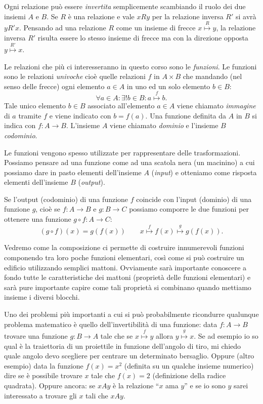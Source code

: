 \documentclass[italian,a4paper,hidelinks,headinclude]{scrartcl}
\newcommand{\myemph}[1]{\emph{#1}\marginpar{#1}}
\begin{document}
Ogni relazione può essere \emph{invertita}
semplicemente scambiando il ruolo
dei due insiemi $A$ e $B$. Se $R$ è una relazione e vale $x R y$
per la relazione inversa $R'$ si avrà
$y R' x$.
Pensando ad una relazione $R$ come un insieme di frecce
$x\stackrel R \mapsto y$,
la relazione inversa $R'$ risulta essere lo stesso insieme di frecce ma
con la direzione opposta $y\stackrel{R'} \mapsto x$.

Le relazioni che più ci interesseranno in questo corso sono le \myemph{funzioni}.
Le funzioni sono le relazioni \emph{univoche} cioè quelle relazioni $f$ in
$A\times B$ che
mandando (nel senso delle frecce) ogni elemento $a\in A$ in uno
ed un solo elemento
$b\in B$:
\[
\forall a\in A\colon \exists ! b\in B\colon a\stackrel{f}\mapsto b.
\]
Tale unico elemento $b\in B$ associato all'elemento $a\in A$ viene chiamato
\emph{immagine} di $a$ tramite $f$ e viene indicato con $b=f(a)$.
Una funzione definita da $A$ in $B$ si indica con $f\colon A \to B$. L'insieme
$A$ viene chiamato \myemph{dominio} e l'insieme $B$ \myemph{codominio}.

Le funzioni vengono spesso utilizzate per rappresentare delle trasformazioni.
Possiamo pensare ad una funzione come ad una scatola nera (un macinino)
a cui possiamo dare in pasto elementi dell'insieme $A$ (\emph{input})
e otteniamo come risposta elementi dell'insieme $B$ (\emph{output}).

Se l'output (codominio) di una funzione $f$
coincide con l'input (dominio) di una funzione $g$,
cioè se $f\colon A \to B$ e $g\colon B \to C$
possiamo comporre
le due funzioni per ottenere una funzione
$g\circ f \colon A \to C$:
\[
(g\circ f)(x) = g(f(x))\qquad
x \stackrel f \mapsto f(x) \stackrel g \mapsto g(f(x)).
\]

Vedremo come la composizione ci permette di costruire innumerevoli funzioni
componendo tra loro poche funzioni elementari, così come si può costruire un edificio
utilizzando semplici mattoni.
Ovviamente sarà importante conoscere a fondo
tutte le caratteristiche dei mattoni (proprietà delle funzioni elementari)
e sarà pure importante capire come tali proprietà si combinano quando mettiamo
insieme i diversi blocchi.

Uno dei problemi più importanti a
cui si può probabilmente ricondurre qualunque problema
matematico è quello dell'invertibilità di una funzione: data $f\colon A\to B$
trovare una funzione $g\colon B\to A$ tale che
se $x\stackrel f \mapsto y$ allora
$y \stackrel g\mapsto x$. Se ad esempio io so qual è la traiettoria di
un proiettile in funzione dell'angolo di tiro, mi chiedo quale angolo devo
scegliere per centrare un determinato bersaglio.
Oppure (altro esempio) data la funzione $f(x) = x^2$ (definita su un qualche insieme
numerico) dire se è possibile trovare $x$ tale che $f(x) = 2$
(definizione della radice quadrata).
Oppure ancora: se $x A y$ è la relazione ``$x$ ama $y$''
e se io sono $y$ sarei interessato a trovare gli $x$ tali che $x A y$.
\end{document}
